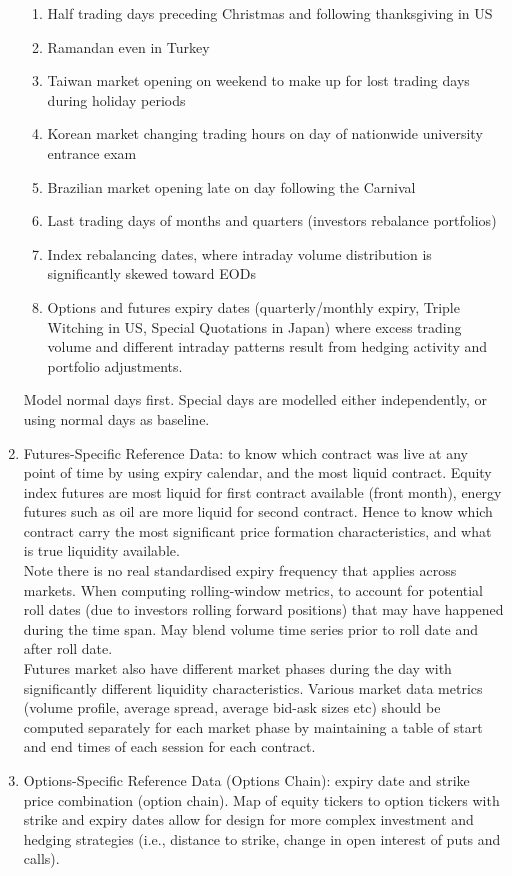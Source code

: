 \begin{enumerate}[label=\roman*.]
\begin{enumerate}[label=\arabic*.]
\setlength{\itemsep}{0pt}
\item Half trading days preceding Christmas and following thanksgiving in US
\item Ramandan even in Turkey
\item Taiwan market opening on weekend to make up for lost trading days during holiday periods
\item Korean market changing trading hours on day of nationwide university entrance exam
\item Brazilian market opening late on day following the Carnival
\item Last trading days of months and quarters (investors rebalance portfolios)
\item Index rebalancing dates, where intraday volume distribution is significantly skewed toward EODs
\item Options and futures expiry dates (quarterly/monthly expiry, Triple Witching in US, Special Quotations in Japan) where excess trading volume and different intraday patterns result from hedging activity and portfolio adjustments.
\end{enumerate}
Model normal days first. Special days are modelled either independently, or using normal days as baseline.
\item Futures-Specific Reference Data: to know which contract was live at any point of time by using expiry calendar, and the most liquid contract. Equity index futures are most liquid for first contract available (front month), energy futures such as oil are more liquid for second contract. Hence to know which contract carry the most significant price formation characteristics, and what is true liquidity available.\\
Note there is no real standardised expiry frequency that applies across markets. When computing rolling-window metrics, to account for potential roll dates (due to investors rolling forward positions) that may have happened during the time span. May blend volume time series prior to roll date and after roll date.\\
Futures market also have different market phases during the day with significantly different liquidity characteristics. Various market data metrics (volume profile, average spread, average bid-ask sizes etc) should be computed separately for each market phase by maintaining a table of start and end times of each session for each contract.
\item Options-Specific Reference Data (Options Chain): expiry date and strike price combination (option chain). Map of equity tickers to option tickers with strike and expiry dates allow for design for more complex investment and hedging strategies (i.e., distance to strike, change in open interest of puts and calls).

\end{enumerate}
